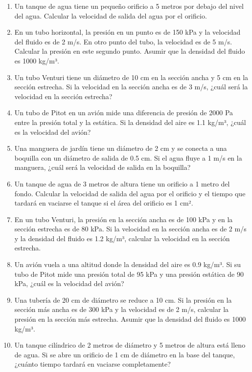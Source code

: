 \documentclass[../main]{subfiles}
\begin{document}
\begin{enumerate}
\item Un tanque de agua tiene un pequeño orificio a 5 metros por debajo del nivel del agua. Calcular la velocidad de salida del agua por el orificio.
\item En un tubo horizontal, la presión en un punto es de 150 kPa y la velocidad del fluido es de 2 m/s. En otro punto del tubo, la velocidad es de 5 m/s. Calcular la presión en este segundo punto. Asumir que la densidad del fluido es 1000 kg/m³.
\item Un tubo Venturi tiene un diámetro de 10 cm en la sección ancha y 5 cm en la sección estrecha. Si la velocidad en la sección ancha es de 3 m/s, ¿cuál será la velocidad en la sección estrecha?
\item Un tubo de Pitot en un avión mide una diferencia de presión de 2000 Pa entre la presión total y la estática. Si la densidad del aire es 1.1 kg/m³, ¿cuál es la velocidad del avión?
\item Una manguera de jardín tiene un diámetro de 2 cm y se conecta a una boquilla con un diámetro de salida de 0.5 cm. Si el agua fluye a 1 m/s en la manguera, ¿cuál será la velocidad de salida en la boquilla?
\item Un tanque de agua de 3 metros de altura tiene un orificio a 1 metro del fondo. Calcular la velocidad de salida del agua por el orificio y el tiempo que tardará en vaciarse el tanque si el área del orificio es 1 cm².
\item En un tubo Venturi, la presión en la sección ancha es de 100 kPa y en la sección estrecha es de 80 kPa. Si la velocidad en la sección ancha es de 2 m/s y la densidad del fluido es 1.2 kg/m³, calcular la velocidad en la sección estrecha.
\item Un avión vuela a una altitud donde la densidad del aire es 0.9 kg/m³. Si su tubo de Pitot mide una presión total de 95 kPa y una presión estática de 90 kPa, ¿cuál es la velocidad del avión?
\item Una tubería de 20 cm de diámetro se reduce a 10 cm. Si la presión en la sección más ancha es de 300 kPa y la velocidad es de 2 m/s, calcular la presión en la sección más estrecha. Asumir que la densidad del fluido es 1000 kg/m³.
\item Un tanque cilíndrico de 2 metros de diámetro y 5 metros de altura está lleno de agua. Si se abre un orificio de 1 cm de diámetro en la base del tanque, ¿cuánto tiempo tardará en vaciarse completamente?
\end{enumerate}
\end{document}
